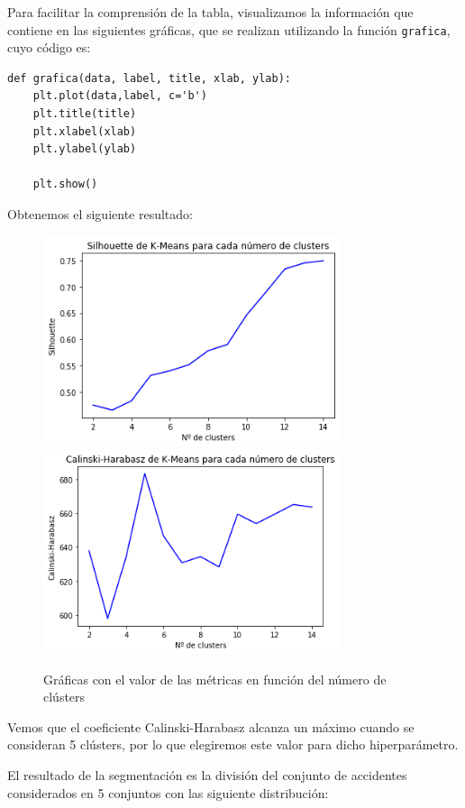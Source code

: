 \documentclass[a4]{article}
\begin{document}
Para facilitar la comprensión de la tabla, visualizamos la información que contiene en las siguientes gráficas, que se realizan utilizando la función \texttt{grafica}, cuyo código es:

\begin{lstlisting}
def grafica(data, label, title, xlab, ylab):
    plt.plot(data,label, c='b')
    plt.title(title)
    plt.xlabel(xlab)
    plt.ylabel(ylab)

    plt.show()
  \end{lstlisting}

Obtenemos el siguiente resultado:

\begin{figure}[H]
  \centering
  \caption{Gráficas con el valor de las métricas en función del número de clústers}
  \includegraphics[width=87mm]{imagenes/c1_kmeans_sil}
  \includegraphics[width=87mm]{imagenes/c1_kmeans_cal}
\end{figure}

Vemos que el coeficiente Calinski-Harabasz alcanza un máximo cuando se consideran 5 clústers, por lo que elegiremos este valor para dicho hiperparámetro.

El resultado de la segmentación es la división del conjunto de accidentes considerados en 5 conjuntos con las siguiente distribución:
\end{document}
